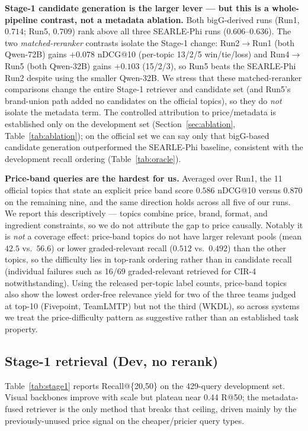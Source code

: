 \documentclass[sigconf,nonacm]{acmart}
\begin{document}
\textbf{Stage-1 candidate generation is the larger lever --- but this is a
whole-pipeline contrast, not a metadata ablation.} Both bigG-derived runs
(Run1, $0.714$; Run5, $0.709$) rank above all three SEARLE-Phi runs
($0.606$--$0.636$). The two \emph{matched-reranker} contrasts isolate the
Stage-1 change: Run2$\to$Run1 (both Qwen-72B) gains $+0.078$ nDCG@10 (per-topic
13/2/5 win/tie/loss) and Run4$\to$Run5 (both Qwen-32B) gains $+0.103$ (15/2/3),
so Run5 beats the SEARLE-Phi Run2 despite using the smaller Qwen-32B. We stress that these matched-reranker
comparisons change the entire Stage-1 retriever and candidate set (and Run5's
brand-union path added no candidates on the official topics), so they do
\emph{not} isolate the metadata term. The controlled attribution to price/metadata
is established only on the development set (Section~\ref{sec:ablation},
Table~\ref{tab:ablation}); on the official set we can say only that bigG-based
candidate generation outperformed the SEARLE-Phi baseline, consistent with the
development recall ordering (Table~\ref{tab:oracle}).

\textbf{Price-band queries are the hardest for us.} Averaged over Run1, the 11
official topics that state an explicit price band score $0.586$ nDCG@10 versus
$0.870$ on the remaining nine, and the same direction holds across all five of
our runs. We report this descriptively --- topics combine price, brand, format,
and ingredient constraints, so we do not attribute the gap to price causally.
Notably it is \emph{not} a coverage effect: price-band topics do not have
larger relevant pools (mean $42.5$ vs.\ $56.6$) or lower graded-relevant recall
($0.512$ vs.\ $0.492$) than the other topics, so the difficulty lies in
top-rank ordering rather than in candidate recall (individual failures such as
16/69 graded-relevant retrieved for CIR-4 notwithstanding). Using the released
per-topic label counts, price-band topics also show the lowest
order-free relevance yield for two of the three teams judged at top-10
(Fivepoint, TeamLMTP) but not the third (WKDL), so across systems we treat the
price-difficulty pattern as suggestive rather than an established task property.

\subsection{Stage-1 retrieval (Dev, no rerank)}
Table~\ref{tab:stage1} reports Recall@\{20,50\} on the 429-query
development set. Visual backbones improve with scale but plateau near
0.44 R@50; the metadata-fused retriever is the only method that breaks that
ceiling, driven mainly by the previously-unused price signal on the
cheaper/pricier query types.
\end{document}
